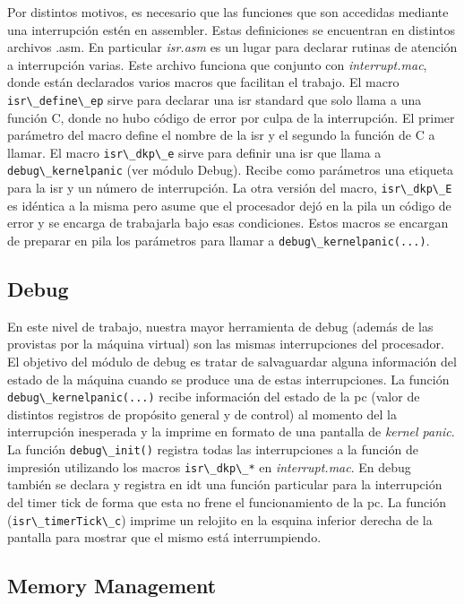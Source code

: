 \documentclass[a4paper]{article}
\newcommand{\file}[1]{\textit{#1}}
\newcommand{\func}[1]{\lstinline{#1}}
\begin{document}
Por distintos motivos, es necesario que las funciones que son accedidas mediante una interrupción estén en assembler. Estas definiciones se encuentran en distintos archivos .asm. En particular \file{isr.asm} es un lugar para declarar rutinas de atención a interrupción varias. Este archivo funciona que conjunto con \file{interrupt.mac}, donde están declarados varios macros que facilitan el trabajo. El macro \func{isr\_define\_ep} sirve para declarar una isr standard que solo llama a una función C, donde no hubo código de error por culpa de la interrupción. El primer parámetro del macro define el nombre de la isr y el segundo la función de C a llamar. El macro \func{isr\_dkp\_e} sirve para definir una isr que llama a \func{debug\_kernelpanic} (ver módulo Debug). Recibe como parámetros una etiqueta para la isr y un número de interrupción. La otra versión del macro, \func{isr\_dkp\_E} es idéntica a la misma pero asume que el procesador dejó en la pila un código de error y se encarga de trabajarla bajo esas condiciones. Estos macros se encargan de preparar en pila los parámetros para llamar a \func{debug\_kernelpanic(...)}.

\subsection{Debug}

En este nivel de trabajo, nuestra mayor herramienta de debug (además de las provistas por la máquina virtual) son las mismas interrupciones del procesador. El objetivo del módulo de debug es tratar de salvaguardar alguna información del estado de la máquina cuando se produce una de estas interrupciones. La función \func{debug\_kernelpanic(...)} recibe información del estado de la pc (valor de distintos registros de propósito general y de control) al momento del la interrupción inesperada y la imprime en formato de una pantalla de \emph{kernel panic}. La función \func{debug\_init()} registra todas las interrupciones a la función de impresión utilizando los macros \func{isr\_dkp\_*} en \file{interrupt.mac}. En debug también se declara y registra en idt una función particular para la interrupción del timer tick de forma que esta no frene el funcionamiento de la pc. La función (\func{isr\_timerTick\_c}) imprime un relojito en la esquina inferior derecha de la pantalla para mostrar que el mismo está interrumpiendo. 

\subsection{Memory Management}
\end{document}
